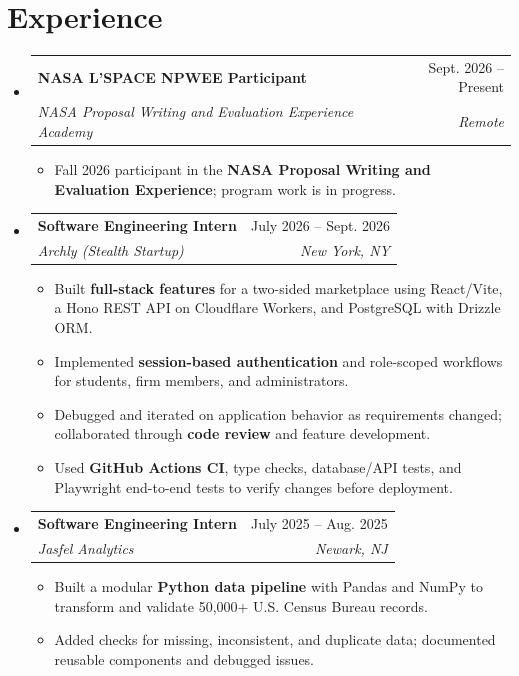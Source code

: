 \documentclass[letterpaper,10pt]{article}
\makeatletter
\newcommand{\resumeItem}[1]{\item\small{#1}}
\newcommand{\resumeSubheading}[4]{
  \vspace{1pt}\item
  \begin{tabular*}{0.97\textwidth}[t]{l@{\extracolsep{\fill}}r}
    \textbf{#1} & #2 \\
    \textit{\small #3} & \textit{\small #4} \\
  \end{tabular*}\vspace{-3pt}
}
\newcommand{\resumeSubHeadingListStart}{\begin{itemize}[leftmargin=0.15in,label={},itemsep=0pt,topsep=0pt]}
\newcommand{\resumeSubHeadingListEnd}{\end{itemize}}
\newcommand{\resumeItemListStart}{\begin{itemize}[leftmargin=0.15in,label=\textbullet,itemsep=-2pt,topsep=0pt]}
\newcommand{\resumeItemListEnd}{\end{itemize}\vspace{0pt}}
\makeatother
\begin{document}
\section{Experience}
\resumeSubHeadingListStart
  \resumeSubheading{NASA L'SPACE NPWEE Participant}{Sept. 2026 -- Present}
    {NASA Proposal Writing and Evaluation Experience Academy}{Remote}
    \resumeItemListStart
      \resumeItem{Fall 2026 participant in the \textbf{NASA Proposal Writing and Evaluation Experience}; program work is in progress.}
    \resumeItemListEnd
  \resumeSubheading{Software Engineering Intern}{July 2026 -- Sept. 2026}
    {Archly (Stealth Startup)}{New York, NY}
    \resumeItemListStart
      \resumeItem{Built \textbf{full-stack features} for a two-sided marketplace using React/Vite, a Hono REST API on Cloudflare Workers, and PostgreSQL with Drizzle ORM.}
      \resumeItem{Implemented \textbf{session-based authentication} and role-scoped workflows for students, firm members, and administrators.}
      \resumeItem{Debugged and iterated on application behavior as requirements changed; collaborated through \textbf{code review} and feature development.}
      \resumeItem{Used \textbf{GitHub Actions CI}, type checks, database/API tests, and Playwright end-to-end tests to verify changes before deployment.}
    \resumeItemListEnd
  \resumeSubheading{Software Engineering Intern}{July 2025 -- Aug. 2025}
    {Jasfel Analytics}{Newark, NJ}
    \resumeItemListStart
      \resumeItem{Built a modular \textbf{Python data pipeline} with Pandas and NumPy to transform and validate 50,000+ U.S. Census Bureau records.}
      \resumeItem{Added checks for missing, inconsistent, and duplicate data; documented reusable components and debugged issues.}
    \resumeItemListEnd
\resumeSubHeadingListEnd
\end{document}
